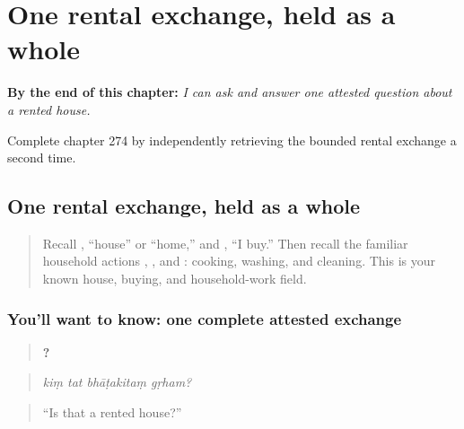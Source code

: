 
\chapter{One rental exchange, held as a whole}
\label{ch:sa-bounded-rental}

\begin{chapteropening}
\textbf{By the end of this chapter:} \emph{I can ask and answer one attested question about a rented house.}

Complete chapter 274 by independently retrieving the bounded rental exchange a second time.
\end{chapteropening}

\section[\texorpdfstring{\sk{किं} \sk{तत्} \sk{भाटकितं} … (kiṃ tat …)}{किं तत् भाटकितं … (kiṃ tat …)}]{One rental exchange, held as a whole}

\label{lesson:SA-C274-meet-one-rental-exchange}



\begin{quote}
Recall \textbf{}, “house” or “home,” and \textbf{}, “I buy.” Then recall the familiar household actions \textbf{}, \textbf{}, and \textbf{}: cooking, washing, and cleaning. This is your known house, buying, and household-work field.
\end{quote}

\subsection*{You'll want to know: one complete attested exchange}
\begin{quote}
\textbf{   ?}
\end{quote}

\begin{quote}
\emph{kiṃ tat bhāṭakitaṃ gṛham?}
\end{quote}

\begin{quote}
“Is that a rented house?”
\end{quote}

